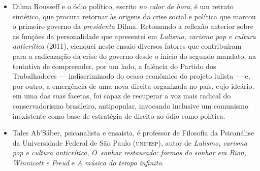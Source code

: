 \begin{itemize}

\item Dilma Rousseff e o ódio político, escrito \emph{no calor da hora}, é um
  retrato sintético, que procura retornar às origens da crise social e política
  que marcou o primeiro governo da \emph{presidenta} Dilma.  Retomando a
  reflexão anterior sobre as funções da personalidade que apresentei em
  \emph{Lulismo, carisma pop e cultura anticrítica} (2011), elenquei neste ensaio
  diversos fatores que contribuíram para a radicazação da crise do governo
  desde o início do segundo mandato, na tentativa de compreender, por um lado,
  a falência do Partido dos Trabalhadores — indiscriminado do ocaso econômico
  do projeto lulista — e, por outro, a emergência de uma nova direita
  organizada no país, cujo ideário, em uma das suas facetas, foi capaz de
  recuperar a voz mais radical do conservadorismo brasileiro, antipopular,
  invocando inclusive um comunismo inexistente como base de estratégia de
  direito ao ódio como política.  

\item Tales Ab’Sáber, psicanalista e ensaísta, é professor de Filosofia da Psicanálise da Universidade Federal 
de São Paulo (\textsc{unifesp}), autor de 
\emph{Lulismo, carisma pop e cultura anticrítica},
\textit{O~sonhar
restaurado: formas do sonhar em Bion, Winnicott e Freud} e
\textit{A música do tempo infinito}. 

\end{itemize}

